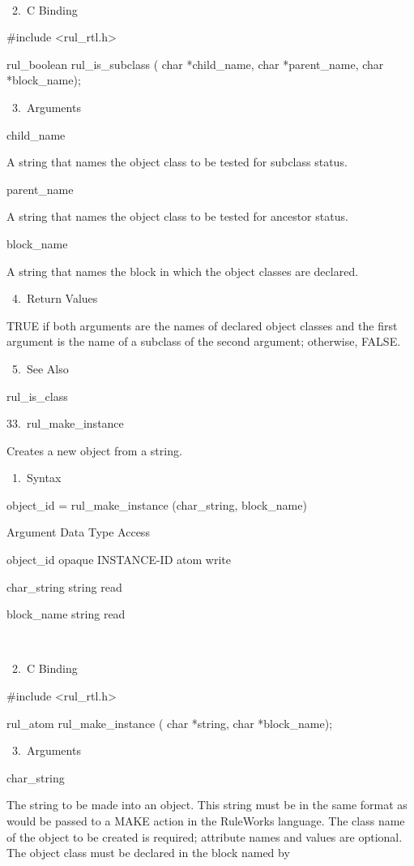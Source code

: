 {           

       2. C Binding

          #include <rul_rtl.h>

          rul_boolean rul_is_subclass (
          char *child_name,
          char *parent_name,
          char *block_name);

       3. Arguments

          child_name

          A string that names the object class
          to be tested for subclass status.

          parent_name

          A string that names the object class
          to be tested for ancestor status.

          block_name

          A string that names the block in
          which the object classes are
          declared.

       4. Return Values

          TRUE if both arguments are the names
          of declared object classes and the
          first argument is the name of a
          subclass of the second argument;
          otherwise, FALSE.

       5. See Also

    rul_is_class

33. rul_make_instance

    Creates a new object from a string.

       1. Syntax

          object_id = rul_make_instance
          (char_string, block_name)

          Argument  Data Type     Access

          object_id  opaque INSTANCE-ID atom
           write

          char_string  string     read

          block_name  string     read

           

       2. C Binding

          #include <rul_rtl.h>

          rul_atom rul_make_instance (
          char *string,
          char *block_name);

       3. Arguments

          char_string

          The string to be made into an
          object. This string must be in the
          same format as would be passed to a
          MAKE action in the RuleWorks
          language. The class name of the
          object to be created is required;
          attribute names and values are
          optional. The object class must be
          declared in the block named by

}
